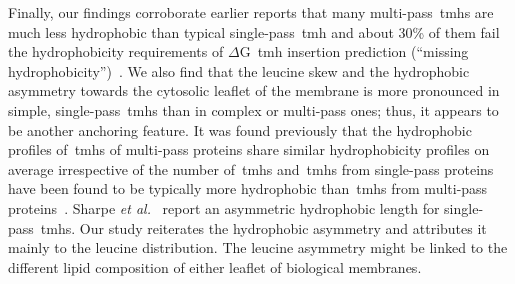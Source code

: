 Finally, our findings corroborate earlier reports that many multi-pass~\gls{tmh}s are much less hydrophobic than typical single-pass~\gls{tmh} and about 30\% of them fail the hydrophobicity requirements of $\Delta$G~\gls{tmh} insertion prediction (``missing hydrophobicity'')~\cite{Hessa2005, Hedin2010, Hessa2007, Ojemalm2012}.
We also find that the leucine skew and the hydrophobic asymmetry towards the cytosolic leaflet of the membrane is more pronounced in simple, single-pass~\gls{tmh}s than in complex or multi-pass ones; thus, it appears to be another anchoring feature.
It was found previously that the hydrophobic profiles of~\gls{tmh}s of multi-pass proteins share similar hydrophobicity profiles on average irrespective of the number of~\gls{tmh}s and~\gls{tmh}s from single-pass proteins have been found to be typically more hydrophobic than~\gls{tmh}s from multi-pass proteins~\cite{Wong2011}.
Sharpe \textit{et al.}~\cite{Sharpe2010} report an asymmetric hydrophobic length for single-pass~\gls{tmh}s.
Our study reiterates the hydrophobic asymmetry and attributes it mainly to the leucine distribution.
The leucine asymmetry might be linked to the different lipid composition of either leaflet of biological membranes.


